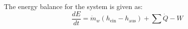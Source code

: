 The energy balance for the system is given as:  
\[
\frac{dE}{dt} = \dot{m}_w (h_{\text{ein}} - h_{\text{aus}}) + \sum \dot{Q} - W
\]